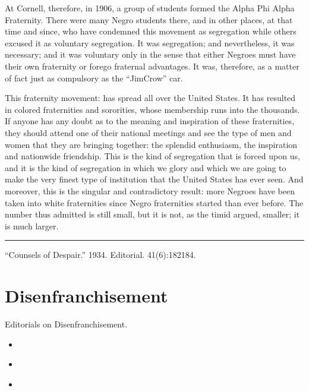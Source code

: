 \documentclass[letterpaper,10pt,english]{jupyterBook}
\begin{document}
\sphinxAtStartPar
At Cornell, therefore, in 1906, a group of students formed the Alpha Phi Alpha Fraternity. There were many Negro students there, and in other places, at that time and since, who have condemned this movement as segregation while others excused it as voluntary segregation. It was segregation; and nevertheless, it was necessary; and it was voluntary only in the sense that either Negroes must have their own fraternity or forego fraternal advantages. It was, therefore, as a matter of fact just as compulsory as the “Jim\sphinxhyphen{}Crow” car.

\sphinxAtStartPar
This fraternity movement: has spread all over the United States. It has resulted in colored fraternities and sororities, whose membership runs into the thousands. If anyone has any doubt as to the meaning and inspiration of these fraternities, they should attend one of their national meetings and see the type of men and women that they are bringing together: the splendid enthusiasm, the inspiration and nationwide friendship. This is the kind of segregation that is forced upon us, and it is the kind of segregation in which we glory and which we are going to make the very finest type of institution that the United States has ever seen. And moreover, this is the singular and contradictory result: more Negroes have been taken into white fraternities since Negro fraternities started than ever before. The number thus admitted is still small, but it is not, as the timid argued, smaller; it is much larger.

\sphinxAtStartPar
{}


\bigskip\hrule\bigskip


\sphinxAtStartPar
{} “Counsels of Despair.” 1934. Editorial.  41(6):182\sphinxhyphen{}184.


\section{Disenfranchisement}
\label{\detokenize{Sections/voting:disenfranchisement}}\label{\detokenize{Sections/voting::doc}}
\sphinxAtStartPar
Editorials on Disenfranchisement.
\begin{itemize}
\item {} 
\sphinxAtStartPar
{\hyperref[\detokenize{Volumes/30/02/disenfranchisement::doc}]{}}

\item {} 
\sphinxAtStartPar
{\hyperref[\detokenize{Volumes/36/05/negro_citizen::doc}]{}}

\item {} 
\sphinxAtStartPar
{\hyperref[\detokenize{Volumes/36/11/negro_in_politics::doc}]{}}

\end{itemize}
\end{document}

